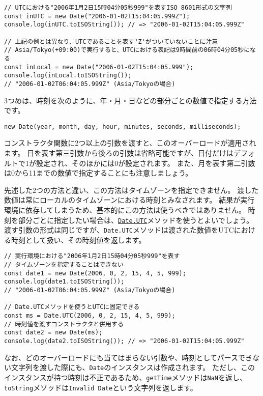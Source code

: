 \begin{lstlisting}
// UTCにおける"2006年1月2日15時04分05秒999"を表すISO 8601形式の文字列
const inUTC = new Date("2006-01-02T15:04:05.999Z");
console.log(inUTC.toISOString()); // => "2006-01-02T15:04:05.999Z"

// 上記の例とは異なり、UTCであることを表す'Z'がついていないことに注意
// Asia/Tokyo(+09:00)で実行すると、UTCにおける表記は9時間前の06時04分05秒になる
const inLocal = new Date("2006-01-02T15:04:05.999");
console.log(inLocal.toISOString()); 
// "2006-01-02T06:04:05.999Z" (Asia/Tokyoの場合)
\end{lstlisting}

3つめは、時刻を次のように、年・月・日などの部分ごとの数値で指定する方法です。

\begin{lstlisting}
new Date(year, month, day, hour, minutes, seconds, milliseconds);
\end{lstlisting}

コンストラクタ関数に2つ以上の引数を渡すと、このオーバーロードが適用されます。
日を表す第三引数から後ろの引数は省略可能ですが、日付だけはデフォルトで1が設定され、そのほかには0が設定されます。
また、月を表す第二引数は0から11までの数値で指定することにも注意しましょう。

先述した2つの方法と違い、この方法はタイムゾーンを指定できません。
渡した数値は常にローカルのタイムゾーンにおける時刻とみなされます。
結果が実行環境に依存してしまうため、基本的にこの方法は使うべきではありません。
時刻を部分ごとに指定したい場合は、\href{https://developer.mozilla.org/ja/docs/Web/JavaScript/Reference/Global_Objects/Date/UTC}{\texttt{Date.UTC}}メソッドを使うとよいでしょう。
渡す引数の形式は同じですが、\texttt{Date.UTC}メソッドは渡された数値をUTCにおける時刻として扱い、その時刻値を返します。

\begin{lstlisting}
// 実行環境における"2006年1月2日15時04分05秒999"を表す
// タイムゾーンを指定することはできない
const date1 = new Date(2006, 0, 2, 15, 4, 5, 999);
console.log(date1.toISOString()); 
// "2006-01-02T06:04:05.999Z" (Asia/Tokyoの場合)

// Date.UTCメソッドを使うとUTCに固定できる
const ms = Date.UTC(2006, 0, 2, 15, 4, 5, 999);
// 時刻値を渡すコンストラクタと併用する
const date2 = new Date(ms);
console.log(date2.toISOString()); // => "2006-01-02T15:04:05.999Z"
\end{lstlisting}

なお、どのオーバーロードにも当てはまらない引数や、時刻としてパースできない文字列を渡した際にも、\texttt{Date}のインスタンスは作成されます。
ただし、このインスタンスが持つ時刻は不正であるため、\texttt{getTime}メソッドは\texttt{NaN}を返し、\texttt{toString}メソッドは\texttt{Invalid Date}という文字列を返します。

